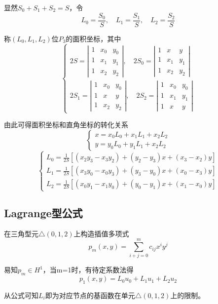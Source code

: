 \documentclass[UTF8,titlepage,twocolumn]{ctexart}
\begin{document}
显然$S_0 + S_1 + S_2 = S$，令
$$
	L_0 = \frac{S_0}{S}, \quad L_1 = \frac{S_1}{S}, \quad L_2 = \frac{S_2}{S}
$$
\par
称$(L_0,L_1,L_2)$位$P_3$的面积坐标，其中
$$
	\begin{cases}
		2S = \left| \begin{matrix}
				1 & x_0 & y_0 \\
				1 & x_1 & y_1 \\
				1 & x_2 & y_2
			 \end{matrix} \right| ,
		 \quad
		 2S_0 = \left| \begin{matrix}
		 			1 & x   & y   \\
		 			1 & x_1 & y_1 \\
		 			1 & x_2 & y_2
		 \end{matrix} \right| 
		 \\
		2S_1 = \left| \begin{matrix}
					1 & x_0 & y_0 \\
					1 & x   & y   \\
					1 & x_2 & y_2
			   \end{matrix} \right|,
		\quad
		2S_2 = \left| \begin{matrix}
					1 & x_0 & y_0 \\
					1 & x_1 & y_1 \\
					1 & x   & y
			   \end{matrix} \right|
	\end{cases}
$$

由此可得面积坐标和直角坐标的转化关系
$$
\begin{cases}
	x = x_0 L_0 + x_1 L_1 + x_2 L_2 \\
	y = y_0 L_0 + y_1 L_1 + x_2 L_2
\end{cases}
$$
$$
	\begin{cases}
		L_0 = \frac{1}{2S} [(x_2 y_3 - x_3 y_2) + (y_2 - y_3) x + (x_3 - x_2) y] \\
		L_1 = \frac{1}{2S} [(x_3 y_0 - x_0 y_3) + (y_3 - y_0) x + (x_0 - x_3) y] \\
		L_2 = \frac{1}{2S} [(x_0 y_1 - x_1 y_0) + (y_0 - y_1) x + (x_1 - x_0) y]
	\end{cases} 
$$

\subsection{Lagrange型公式}

在三角型元$ \bigtriangleup(0,1,2) $上构造插值多项式
$$
	p_m(x,y) = \sum\limits_{i+j=0}^m c_{ij} x^i y^j
$$
\par
易知$p_m \in H^1$，当m=1时，有待定系数法得
$$
	p_1(x,y) = L_0 u_0 + L_1 u_1 + L_2 u_2
$$ 
\par
从公式可知$L_i$即为对应节点的基函数在单元$ \bigtriangleup(0,1,2) $上的限制。
\end{document}
